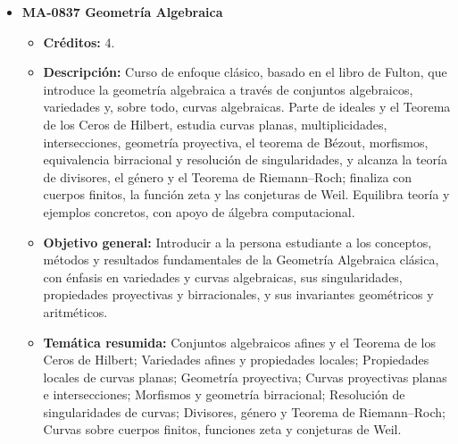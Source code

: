 \begin{itemize}[leftmargin=1.3em, itemsep=10pt, topsep=4pt, label={\color{Azul-UCR}$\blacksquare$}]
\item {\color{Azul-UCR}\textbf{MA-0837 Geometría Algebraica}}\par\nopagebreak\smallskip
\begin{itemize}[leftmargin=1.1em, itemsep=3pt, topsep=2pt, parsep=2pt, label={\textendash}]
\item \textbf{Créditos:} 4.
\item \textbf{Descripción:} Curso de enfoque clásico, basado en el libro de Fulton, que introduce la geometría algebraica a través de conjuntos algebraicos, variedades y, sobre todo, curvas algebraicas. Parte de ideales y el Teorema de los Ceros de Hilbert, estudia curvas planas, multiplicidades, intersecciones, geometría proyectiva, el teorema de Bézout, morfismos, equivalencia birracional y resolución de singularidades, y alcanza la teoría de divisores, el género y el Teorema de Riemann--Roch; finaliza con cuerpos finitos, la función zeta y las conjeturas de Weil. Equilibra teoría y ejemplos concretos, con apoyo de álgebra computacional.
\item \textbf{Objetivo general:} Introducir a la persona estudiante a los conceptos, métodos y resultados fundamentales de la Geometría Algebraica clásica, con énfasis en variedades y curvas algebraicas, sus singularidades, propiedades proyectivas y birracionales, y sus invariantes geométricos y aritméticos.
\item \textbf{Temática resumida:} Conjuntos algebraicos afines y el Teorema de los Ceros de Hilbert; Variedades afines y propiedades locales; Propiedades locales de curvas planas; Geometría proyectiva; Curvas proyectivas planas e intersecciones; Morfismos y geometría birracional; Resolución de singularidades de curvas; Divisores, género y Teorema de Riemann--Roch; Curvas sobre cuerpos finitos, funciones zeta y conjeturas de Weil.
\end{itemize}


\end{itemize}
